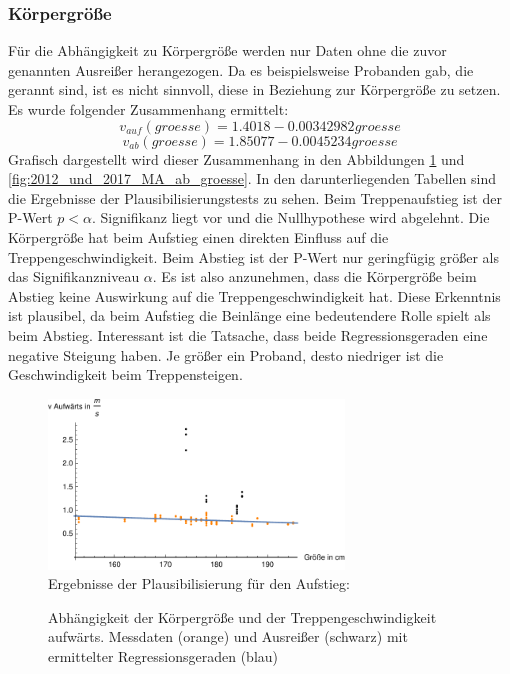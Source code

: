 	
	
	
	
	\subsubsection{Körpergröße}
	Für die Abhängigkeit zu Körpergröße werden nur Daten ohne die zuvor genannten Ausreißer herangezogen. Da es beispielsweise Probanden gab, die gerannt sind, ist es nicht sinnvoll, diese in Beziehung zur Körpergröße zu setzen. Es wurde folgender Zusammenhang ermittelt:
	\begin{equation}
	v_{auf}(groesse) = 1.4018 -0.00342982 groesse
	\label{eq:2012_2017_AufGroesse_MA}
	\end{equation}
	\begin{equation}
	v_{ab}(groesse) = 1.85077 -0.0045234 groesse
	\label{eq:2012_2017_AbGroesse_MA}
	\end{equation}
	Grafisch dargestellt wird dieser Zusammenhang in den Abbildungen \ref{fig:2012_und_2017_MA_auf_groesse} und \ref{fig:2012_und_2017_MA_ab_groesse}. In den darunterliegenden Tabellen sind die Ergebnisse der Plausibilisierungstests zu sehen. Beim Treppenaufstieg ist der P-Wert $p<\alpha$. Signifikanz liegt vor und die Nullhypothese wird abgelehnt. Die Körpergröße hat beim Aufstieg einen direkten Einfluss auf die Treppengeschwindigkeit. Beim Abstieg ist der P-Wert nur geringfügig größer als das Signifikanzniveau $\alpha$. Es ist also anzunehmen, dass die Körpergröße beim Abstieg keine Auswirkung auf die Treppengeschwindigkeit hat. Diese Erkenntnis ist plausibel, da beim Aufstieg die Beinlänge eine bedeutendere Rolle spielt als beim Abstieg. Interessant ist die  Tatsache, dass beide Regressionsgeraden eine negative Steigung haben. Je größer ein Proband, desto niedriger ist die Geschwindigkeit beim Treppensteigen.
	
	\begin{figure}[htpb]
		\centering
		\includegraphics[width=0.7\textwidth]{abbildungen/regression/2012_2017_verbund/ohneausreisser/auf-groesse.pdf}
		\justify \ \\
		Ergebnisse der Plausibilisierung für den Aufstieg:
		
		\caption{Abhängigkeit der Körpergröße und der Treppengeschwindigkeit aufwärts. Messdaten (orange) und Ausreißer (schwarz) mit ermittelter Regressionsgeraden (blau)}
		\label{fig:2012_und_2017_MA_auf_groesse}
	\end{figure}
	
